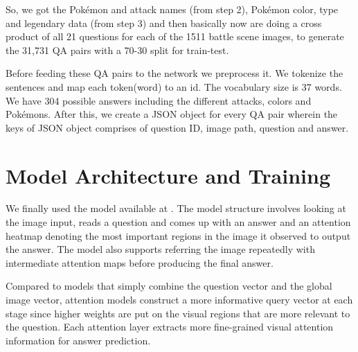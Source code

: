 \documentclass[journal, a4paper]{IEEEtran}
\begin{document}
So, we got the Pok\'emon and attack names (from step 2), Pok\'emon color, type and legendary data (from step 3) and then basically now are doing a cross product of all 21 questions for each of the 1511 battle scene images, to generate the 31,731 QA pairs with a 70-30 split for train-test.

Before feeding these QA pairs to the network we preprocess it. We tokenize the sentences and map each token(word) to an id. The vocabulary size is 37 words. We have 304 possible answers including the different attacks, colors and Pok\'emons. After this, we create a JSON object for every QA pair wherein the keys of JSON object comprises of question ID, image path, question and answer.

\section{Model Architecture and Training}
	We finally used the model available at \cite{VQA_MODEL}. The model structure involves looking at the image input, reads a question and comes up with an answer and an attention heatmap denoting the most important regions in the image it observed to output the answer. The model also supports referring the image repeatedly with intermediate attention maps before producing the final answer. 
    
    Compared to models that simply combine the question
vector and the global image vector, attention models
construct a more informative query vector at each stage since higher weights are put on the visual regions that are more relevant to the question. Each attention layer extracts more fine-grained visual attention information
for answer prediction.
\end{document}

